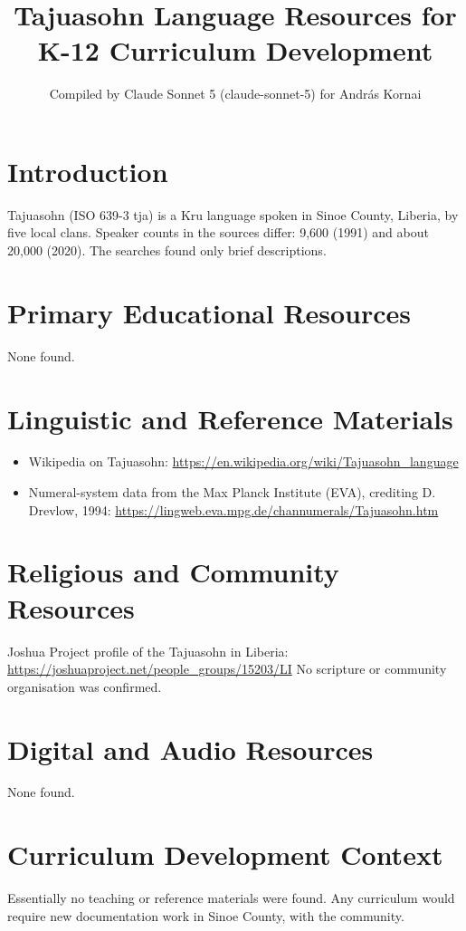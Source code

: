 \documentclass[12pt]{article}
\title{Tajuasohn Language Resources for K-12 Curriculum Development}
\author{Compiled by Claude Sonnet 5 (claude-sonnet-5) for Andr\'as Kornai}
\date{}
\begin{document}
\maketitle
\section{Introduction}
Tajuasohn (ISO 639-3 tja) is a Kru language spoken in Sinoe County, Liberia, by five local clans. Speaker counts in the sources differ: 9,600 (1991) and about 20,000 (2020). The searches found only brief descriptions.

\section{Primary Educational Resources}
None found.

\section{Linguistic and Reference Materials}
\begin{itemize}
\item Wikipedia on Tajuasohn: \url{https://en.wikipedia.org/wiki/Tajuasohn_language}
\item Numeral-system data from the Max Planck Institute (EVA), crediting D. Drevlow, 1994: \url{https://lingweb.eva.mpg.de/channumerals/Tajuasohn.htm}
\end{itemize}

\section{Religious and Community Resources}
Joshua Project profile of the Tajuasohn in Liberia: \url{https://joshuaproject.net/people_groups/15203/LI}
No scripture or community organisation was confirmed.

\section{Digital and Audio Resources}
None found.

\section{Curriculum Development Context}
Essentially no teaching or reference materials were found. Any curriculum would require new documentation work in Sinoe County, with the community.
\end{document}
